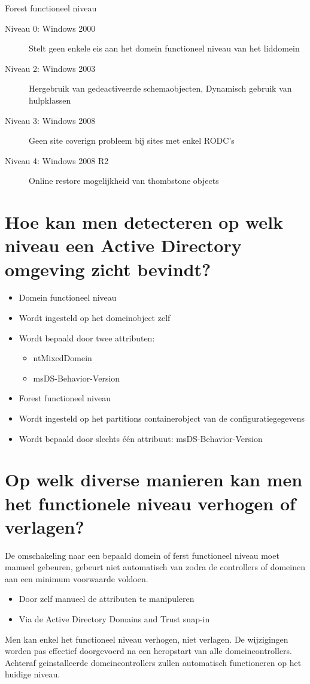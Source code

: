 Forest functioneel niveau
\begin{description}
	\item[Niveau 0: Windows 2000] Stelt geen enkele eis aan het domein
		functioneel niveau van het liddomein
	\item[Niveau 2: Windows 2003] Hergebruik van gedeactiveerde
		schemaobjecten, Dynamisch gebruik van hulpklassen
	\item[Niveau 3: Windows 2008] Geen site coverign probleem bij sites met
		enkel RODC's
	\item[Niveau 4: Windows 2008 R2] Online restore mogelijkheid van
		thombstone objects
\end{description}

\section{Hoe kan men detecteren op welk niveau een Active Directory omgeving
zicht bevindt?}

\begin{itemize}
	\item Domein functioneel niveau
	\item Wordt ingesteld op het domeinobject zelf
	\item Wordt bepaald door twee attributen:
		\begin{itemize}
			\item ntMixedDomein
			\item msDS-Behavior-Version
		\end{itemize}
\end{itemize}

\begin{itemize}
	\item Forest functioneel niveau
	\item Wordt ingesteld op het partitions containerobject van de
		configuratiegegevens
	\item Wordt bepaald door slechts één attribuut: msDS-Behavior-Version
\end{itemize}

\section{Op welk diverse manieren kan men het functionele niveau verhogen of
verlagen?}

De omschakeling naar een bepaald domein of ferst functioneel niveau moet manueel
gebeuren, gebeurt niet automatisch van zodra de controllers of domeinen aan een
minimum voorwaarde voldoen.
\begin{itemize}
	\item Door zelf manueel de attributen te manipuleren
	\item Via de Active Directory Domains and Trust snap-in
\end{itemize}
Men kan enkel het functioneel niveau verhogen, niet verlagen. De wijzigingen
worden pas effectief doorgevoerd na een heropstart van alle domeincontrollers.
Achteraf geinstalleerde domeincontrollers zullen automatisch functioneren op het
huidige niveau.
